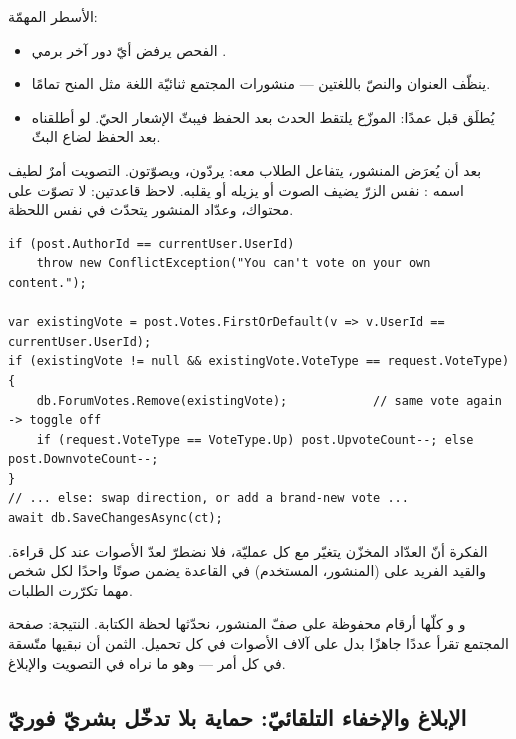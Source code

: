 الأسطر المهمّة:
\begin{itemize}
\item الفحص  يرفض أيّ دور آخر برمي .
\item {} ينظّف العنوان والنصّ باللغتين — منشورات المجتمع ثنائيّة اللغة
  مثل المنح تمامًا.
\item {} يُطلَق قبل  عمدًا: الموزّع
  يلتقط الحدث بعد الحفظ فيبثّ الإشعار الحيّ. لو أطلقناه بعد الحفظ لضاع البثّ.
\end{itemize}

بعد أن يُعرَض المنشور، يتفاعل الطلاب معه: يردّون، ويصوّتون. التصويت أمرٌ لطيف اسمه
: نفس الزرّ يضيف الصوت أو يزيله أو يقلبه. لاحظ قاعدتين: لا تصوّت
على محتواك، وعدّاد المنشور يتحدّث في نفس اللحظة.

\begin{english}
\begin{lstlisting}[language={[Sharp]C}]
if (post.AuthorId == currentUser.UserId)
    throw new ConflictException("You can't vote on your own content.");

var existingVote = post.Votes.FirstOrDefault(v => v.UserId == currentUser.UserId);
if (existingVote != null && existingVote.VoteType == request.VoteType)
{
    db.ForumVotes.Remove(existingVote);            // same vote again -> toggle off
    if (request.VoteType == VoteType.Up) post.UpvoteCount--; else post.DownvoteCount--;
}
// ... else: swap direction, or add a brand-new vote ...
await db.SaveChangesAsync(ct);
\end{lstlisting}
\end{english}

الفكرة أنّ العدّاد المخزّن  يتغيّر مع كل عمليّة، فلا نضطرّ لعدّ الأصوات
عند كل قراءة. والقيد الفريد على (المنشور، المستخدم) في القاعدة يضمن صوتًا واحدًا لكل شخص
مهما تكرّرت الطلبات.

\begin{keyp}
 و و كلّها أرقام محفوظة على صفّ المنشور،
نحدّثها لحظة الكتابة. النتيجة: صفحة المجتمع تقرأ عددًا جاهزًا بدل  على آلاف
الأصوات في كل تحميل. الثمن أن نبقيها متّسقة في كل أمر — وهو ما نراه في التصويت والإبلاغ.
\end{keyp}

\subsection{الإبلاغ والإخفاء التلقائيّ: حماية بلا تدخّل بشريّ فوريّ}

